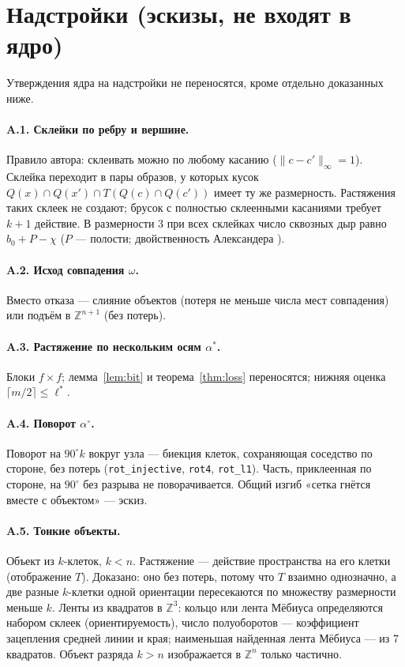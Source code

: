 \documentclass[11pt,a4paper]{article}
\theoremstyle{plain}
\theoremstyle{definition}
\theoremstyle{remark}
\newcommand{\Z}{\mathbb{Z}}
\newcommand{\lean}[1]{\texttt{#1}}
\begin{document}
\appendix
\section{Надстройки (эскизы, не входят в ядро)}

Утверждения ядра на надстройки не переносятся, кроме отдельно доказанных ниже.

\paragraph{A.1. Склейки по ребру и вершине.} Правило автора: склеивать можно по любому касанию ($\|c-c'\|_\infty=1$). Склейка переходит в пары образов, у которых кусок $Q(x)\cap Q(x')\cap T(Q(c)\cap Q(c'))$ имеет ту же размерность. Растяжения таких склеек не создают; брусок с полностью склеенными касаниями требует $k+1$ действие. В размерности 3 при всех склейках число сквозных дыр равно $b_0+P-\chi$ ($P$ — полости; двойственность Александера \cite{toriwaki}).

\paragraph{A.2. Исход совпадения $\omega$.} Вместо отказа — слияние объектов (потеря не меньше числа мест совпадения) или подъём в $\Z^{n+1}$ (без потерь).

\paragraph{A.3. Растяжение по нескольким осям $\alpha^*$.} Блоки $f\times f$; лемма~\ref{lem:bit} и теорема~\ref{thm:loss} переносятся; нижняя оценка $\lceil m/2\rceil\le\ell^*$.

\paragraph{A.4. Поворот $\alpha^\circ$.} Поворот на $90^\circ k$ вокруг узла — биекция клеток, сохраняющая соседство по стороне, без потерь (\lean{rot\_injective}, \lean{rot4}, \lean{rot\_l1}). Часть, приклеенная по стороне, на $90^\circ$ без разрыва не поворачивается. Общий изгиб «сетка гнётся вместе с объектом» — эскиз.

\paragraph{A.5. Тонкие объекты.} Объект из $k$-клеток, $k<n$. Растяжение — действие пространства на его клетки (отображение $T$). Доказано: оно без потерь, потому что $T$ взаимно однозначно, а две разные $k$-клетки одной ориентации пересекаются по множеству размерности меньше $k$. Ленты из квадратов в $\Z^3$: кольцо или лента Мёбиуса определяются набором склеек (ориентируемость), число полуоборотов — коэффициент зацепления средней линии и края; наименьшая найденная лента Мёбиуса — из 7 квадратов. Объект разряда $k>n$ изображается в $\Z^n$ только частично.
\end{document}
